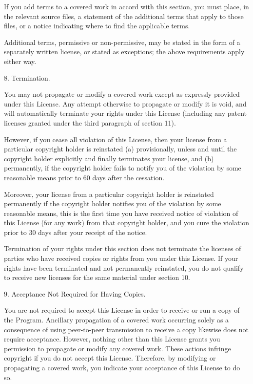 \documentclass[11pt]{book}
\begin{document}
    If you add terms to a covered work in accord with this section, you
    must place, in the relevant source files, a statement of the
    additional terms that apply to those files, or a notice indicating
    where to find the applicable terms.

    Additional terms, permissive or non-permissive, may be stated in the
    form of a separately written license, or stated as exceptions;
    the above requirements apply either way.

    8. Termination.

    You may not propagate or modify a covered work except as expressly
    provided under this License.  Any attempt otherwise to propagate or
    modify it is void, and will automatically terminate your rights under
    this License (including any patent licenses granted under the third
    paragraph of section 11).

    However, if you cease all violation of this License, then your
    license from a particular copyright holder is reinstated (a)
    provisionally, unless and until the copyright holder explicitly and
    finally terminates your license, and (b) permanently, if the copyright
    holder fails to notify you of the violation by some reasonable means
    prior to 60 days after the cessation.

    Moreover, your license from a particular copyright holder is
    reinstated permanently if the copyright holder notifies you of the
    violation by some reasonable means, this is the first time you have
    received notice of violation of this License (for any work) from that
    copyright holder, and you cure the violation prior to 30 days after
    your receipt of the notice.

    Termination of your rights under this section does not terminate the
    licenses of parties who have received copies or rights from you under
    this License.  If your rights have been terminated and not permanently
    reinstated, you do not qualify to receive new licenses for the same
    material under section 10.

    9. Acceptance Not Required for Having Copies.

    You are not required to accept this License in order to receive or
    run a copy of the Program.  Ancillary propagation of a covered work
    occurring solely as a consequence of using peer-to-peer transmission
    to receive a copy likewise does not require acceptance.  However,
    nothing other than this License grants you permission to propagate or
    modify any covered work.  These actions infringe copyright if you do
    not accept this License.  Therefore, by modifying or propagating a
    covered work, you indicate your acceptance of this License to do so.
\end{document}
